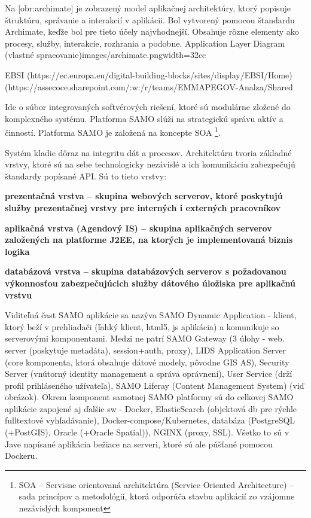 Na [obr:archimate] je zobrazený model aplikačnej architektúry, ktorý popisuje štruktúru, správanie a interakcií v aplikácii. Bol vytvorený pomocou štandardu Archimate, keďže bol pre tieto účely najvhodnejší. Obsahuje rôzne elementy ako procesy, služby, interakcie, rozhrania a podobne.
{Application Layer Diagram (vlastné spracovanie)}{images/archimate.png}{width=32cc}

\TODO EBSI (https://ec.europa.eu/digital-building-blocks/sites/display/EBSI/Home) (https://assecoce.sharepoint.com/:w:/r/teams/EMMAPEGOV-Analza/Shared%

Ide o súbor integrovaných softvérových riešení, ktoré sú modulárne zložené do komplexného systému. Platforma SAMO slúži na strategickú správu aktív a činností. Platforma SAMO je založená na koncepte SOA \footnote{SOA -- Servisne orientovaná architektúra (Service Oriented Architecture) -- sada princípov a metodológií, ktorá odporúča stavbu aplikácií zo vzájomne nezávislých komponent}. %


Systém kladie dôraz na integritu dát a procesov. Architektúru tvoria základné vrstvy, ktoré sú na sebe technologicky nezávislé a ich komunikáciu zabezpečujú štandardy popísané API. Sú to tieto vrstvy:

\startitemize
\item \start\bf prezentačná vrstva \stop -- skupina webových serverov, ktoré poskytujú služby prezentačnej vrstvy pre interných i externých pracovníkov
\item \start\bf aplikačná vrstva \stop (Agendový IS) -- skupina aplikačných serverov založených na platforme J2EE, na ktorých je implementovaná biznis logika
\item  \start\bf databázová vrstva \stop -- skupina databázových serverov s požadovanou výkonnosťou zabezpečujúcich služby dátového úložiska pre aplikačnú vrstvu
\stopitemize

Viditeľná čast SAMO aplikácie sa nazýva SAMO Dynamic Application - klient, ktorý beží v prehliadači (ľahký klient, html5, js aplikácia) a komunikuje so serverovými komponentami. Medzi ne patrí SAMO Gateway (3 úlohy - web. server (poskytuje metadáta), session+auth, proxy), LIDS Application Server (core komponenta, ktorá obsahuje dátové modely, pôvodne GIS AS), Security Server (vnútorný identity management a správa oprávnení), User Service (drží profil prihláseného užívateľa), SAMO Liferay (Content Management System) (viď obrázok). Okrem komponent samotnej SAMO platformy sú do celkovej SAMO aplikácie zapojené aj ďalšie sw - Docker, ElasticSearch (objektová db pre rýchle fulltextové vyhľadávanie), Docker-compose/Kubernetes, databáza (PostgreSQL (+PostGIS), Oracle (+Oracle Spatial)), NGINX (proxy, SSL). Všetko to sú v Jave napísané aplikácia bežiace na serveri, ktoré sú ale púšťané pomocou Dockeru.

